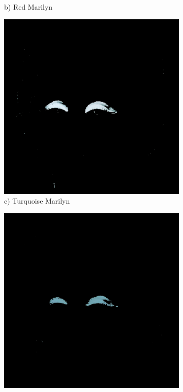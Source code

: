 \documentclass{article}
\begin{document}
\begin{figure}[htbp]
\begin{subfigure}[b]{0.19\textwidth}
        \caption*{b) Red Marilyn}
    \end{subfigure}
    \hfill
    \begin{subfigure}[b]{0.19\textwidth}
        \includegraphics[width=\textwidth]{main_files/figure-latex/10_3_turq_marilyn_eyeshadow_extraction.jpg}
        \caption*{c) Turquoise Marilyn}
    \end{subfigure}
    \hfill
    \begin{subfigure}[b]{0.19\textwidth}
        \includegraphics[width=\textwidth]{main_files/figure-latex/11_3_blue_marilyn_eyeshadow_extraction.jpg}

\end{subfigure}
\end{figure}
\end{document}
